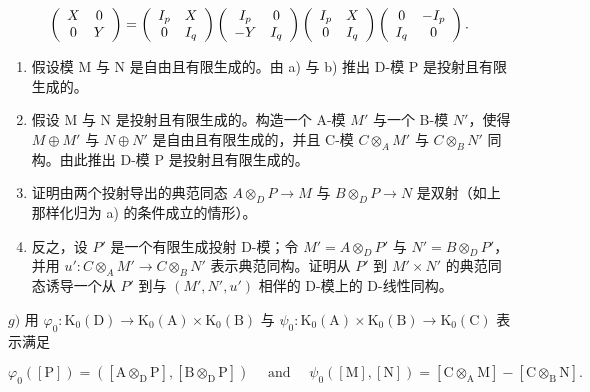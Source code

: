 \[
\left( \begin{array}{c c} X & 0 \\ 0 & Y \end{array} \right) = \left( \begin{array}{c c} I _ {p} & X \\ 0 & I _ {q} \end{array} \right) \left( \begin{array}{c c} I _ {p} & 0 \\ - Y & I _ {q} \end{array} \right) \left( \begin{array}{c c} I _ {p} & X \\ 0 & I _ {q} \end{array} \right) \left( \begin{array}{c c} 0 & - I _ {p} \\ I _ {q} & 0 \end{array} \right).
\]

\begin{enumerate}
\def\labelenumi{\alph{enumi})}
\setcounter{enumi}{2}
\item
  假设模 M 与 N 是自由且有限生成的。由 a) 与 b) 推出 D-模 P 是投射且有限生成的。
\item
  假设 M 与 N 是投射且有限生成的。构造一个 A-模 \(M'\) 与一个 B-模 \(N'\)，使得 \(M \oplus M'\) 与 \(N \oplus N'\) 是自由且有限生成的，并且 C-模 \(C \otimes_{A} M'\) 与 \(C \otimes_{B} N'\) 同构。由此推出 D-模 P 是投射且有限生成的。
\item
  证明由两个投射导出的典范同态 \(A \otimes_{D} P \to M\) 与 \(B \otimes_{D} P \to N\) 是双射（如上那样化归为 a) 的条件成立的情形）。
\item
  反之，设 \(P'\) 是一个有限生成投射 D-模；令 \(M' = A \otimes_{D} P'\) 与 \(N' = B \otimes_{D} P'\)，并用 \(u' : C \otimes_{A} M' \to C \otimes_{B} N'\) 表示典范同构。证明从 \(P'\) 到 \(M' \times N'\) 的典范同态诱导一个从 \(P'\) 到与 \((M', N', u')\) 相伴的 D-模上的 D-线性同构。
\end{enumerate}

\(g)\) 用 \(\varphi_0:\mathrm{K}_0(\mathrm{D})\to \mathrm{K}_0(\mathrm{A})\times \mathrm{K}_0(\mathrm{B})\) 与 \(\psi_0:\mathrm{K}_0(\mathrm{A})\times \mathrm{K}_0(\mathrm{B})\to \mathrm{K}_0(\mathrm{C})\) 表示满足

\[
\varphi_ {0} ([ \mathrm{P} ]) = ([ \mathrm{A} \otimes_ {\mathrm{D}} \mathrm{P} ], [ \mathrm{B} \otimes_ {\mathrm{D}} \mathrm{P} ]) \quad \text { and } \quad \psi_ {0} ([ \mathrm{M} ], [ \mathrm{N} ]) = [ \mathrm{C} \otimes_ {\mathrm{A}} \mathrm{M} ] - [ \mathrm{C} \otimes_ {\mathrm{B}} \mathrm{N} ].
\]

